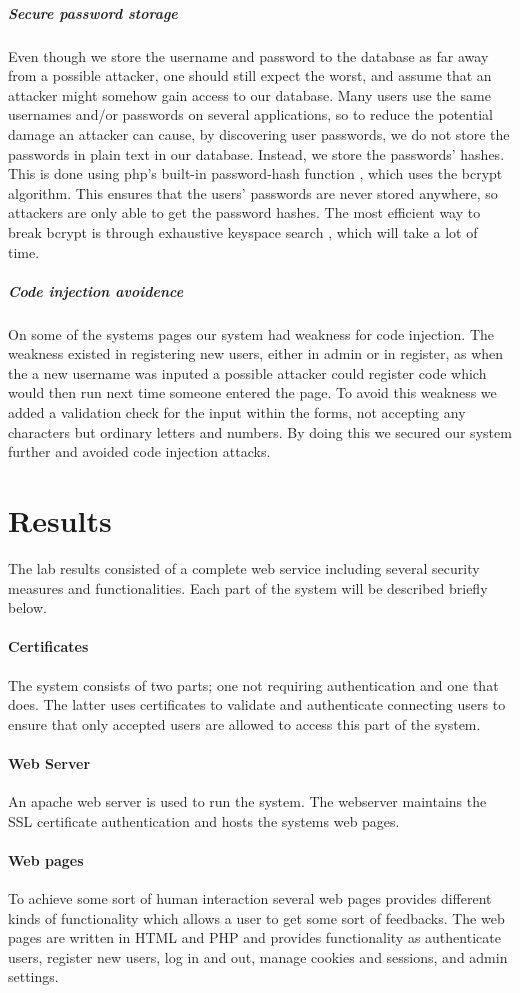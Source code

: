 \documentclass[11pt, a4paper]{article}
\begin{document}
\subparagraph{Secure password storage}
Even though we store the username and password to the database as far away from a possible attacker, one should still expect the worst, and assume that an attacker might somehow gain access to our database. Many users use the same usernames and/or passwords on several applications, so to reduce the potential damage an attacker can cause, by discovering user passwords, we do not store the passwords in plain text in our database. Instead, we store the passwords' hashes. This is done using php's built-in password-hash function \cite{php-hash}, which uses the bcrypt \cite{schneier} algorithm. This ensures that the users' passwords are never stored anywhere, so attackers are only able to get the password hashes. The most efficient way to break bcrypt is through exhaustive keyspace search \cite{schneier}, which will take a lot of time.
\subparagraph{Code injection avoidence}
On some of the systems pages our system had weakness for code injection. The weakness existed in registering new users, either in admin or in register, as when the a new username was inputed a possible attacker could register code which would then run next time someone entered the page. To avoid this weakness we added a validation check for the input within the forms, not accepting any characters but ordinary letters and numbers. By doing this we secured our system further and avoided code injection attacks.

\section{Results}
The lab results consisted of a complete web service including several security measures and functionalities. Each part of the system will be described briefly below.
\paragraph{Certificates}
The system consists of two parts; one not requiring authentication and one that does. The latter uses certificates to validate and authenticate connecting users to ensure that only accepted users are allowed to access this part of the system. 
\paragraph{Web Server}
An apache web server is used to run the system. The webserver maintains the SSL certificate authentication and hosts the systems web pages.
\paragraph{Web pages}
To achieve some sort of human interaction several web pages provides different kinds of functionality which allows a user to get some sort of feedbacks. The web pages are written in HTML and PHP and provides functionality as authenticate users, register new users, log in and out, manage cookies and sessions, and admin settings.
\end{document}

